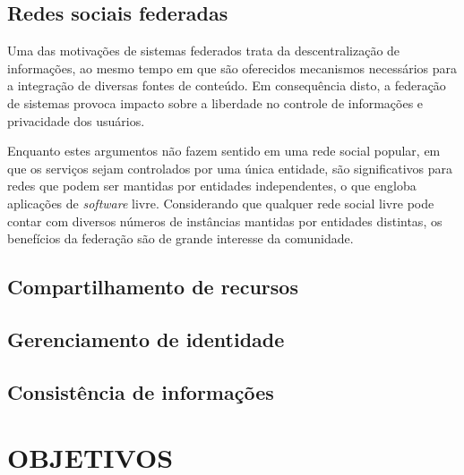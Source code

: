 

\subsection{Redes sociais federadas}


Uma das motivações de sistemas federados trata da descentralização de informações,
ao mesmo tempo em que são oferecidos mecanismos necessários para a integração de
diversas fontes de conteúdo. Em consequência disto, a federação de sistemas provoca
impacto sobre a liberdade no controle de informações e privacidade dos usuários.

Enquanto estes argumentos não fazem sentido em uma rede social popular, em que os
serviços sejam controlados por uma única entidade, são significativos para redes que
podem ser mantidas por entidades independentes, o que engloba aplicações de
\textit{software} livre. Considerando que qualquer rede social livre pode contar com
diversos números de instâncias mantidas por entidades distintas, os benefícios da
federação são de grande interesse da comunidade.

\subsection{Compartilhamento de recursos}

\subsection{Gerenciamento de identidade}

\subsection{Consistência de informações}



\section{OBJETIVOS}
